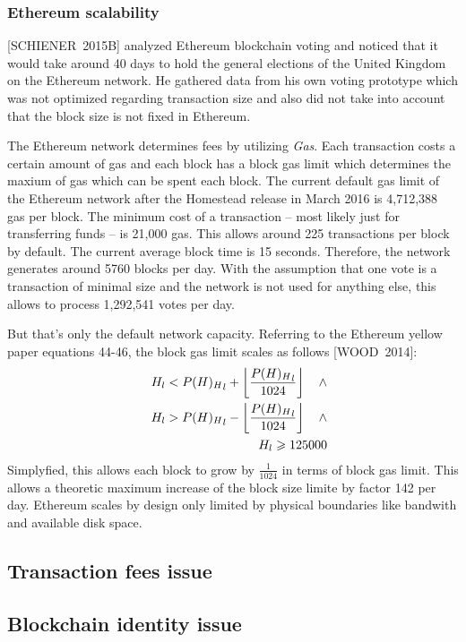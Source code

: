 \documentclass[9pt,oneside]{amsart}
\begin{document}
\begin{multicols}{2}
\subsubsection{Ethereum scalability}
[SCHIENER~2015B] analyzed Ethereum blockchain voting and noticed that it would take around 40 days to hold the general elections of the United Kingdom on the Ethereum network. He gathered data from his own voting prototype which was not optimized regarding transaction size and also did not take into account that the block size is not fixed in Ethereum.\par
The Ethereum network determines fees by utilizing \textit{Gas}. Each transaction costs a certain amount of gas and each block has a block gas limit which determines the maxium of gas which can be spent each block. The current default gas limit of the Ethereum network after the Homestead release in March 2016 is 4,712,388 gas per block. The minimum cost of a transaction -- most likely just for transferring funds -- is 21,000 gas. This allows around 225 transactions per block by default. The current average block time is 15 seconds. Therefore, the network generates around 5760 blocks per day. With the assumption that one vote is a transaction of minimal size and the network is not used for anything else, this allows to process 1,292,541 votes per day.\par
But that's only the default network capacity. Referring to the Ethereum yellow paper equations 44-46, the block gas limit scales as follows [WOOD~2014]:
\begin{eqnarray} \addtocounter{equation}{43}
& & H_l < {P(H)_H}_l + \left\lfloor\frac{{P(H)_H}_l}{1024}\right\rfloor \quad \wedge \\
& & H_l > {P(H)_H}_l - \left\lfloor\frac{{P(H)_H}_l}{1024}\right\rfloor \quad \wedge \\
& & H_l \geqslant 125000
\end{eqnarray}
Simplyfied, this allows each block to grow by $\frac{1}{1024}$ in terms of block gas limit. This allows a theoretic maximum increase of the block size limite by factor 142 per day. Ethereum scales by design only limited by physical boundaries like bandwith and available disk space.

\subsection{Transaction fees issue}
\subsection{Blockchain identity issue}

\end{multicols}
\end{document}
